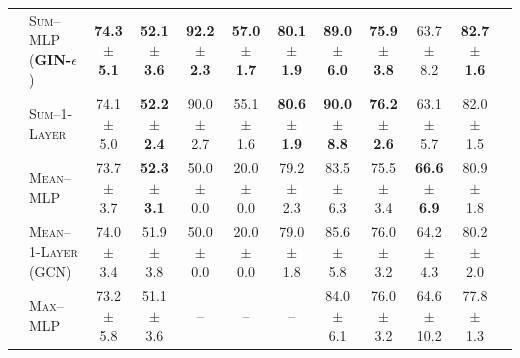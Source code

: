 \begin{table}[t]
{\begin{tabular}{@{}clcccccccccc@{}}
& \textsc{Sum--MLP ({\bf GIN-$\epsilon$}})   &  {\bf 74.3 $\pm$ 5.1}     & {\bf 52.1 $\pm$ 3.6}    &  {\bf 92.2 $\pm$ 2.3}             &  {\bf 57.0 $\pm$ 1.7}             & {\bf 80.1 $\pm$ 1.9}      &  {\bf 89.0 $\pm$ 6.0}     & {\bf 75.9 $\pm$ 3.8}    & 63.7 $\pm$ 8.2  & {\bf 82.7 $\pm$ 1.6}   \\
& \textsc{Sum--1-Layer}     &  74.1 $\pm$ 5.0    & {\bf 52.2 $\pm$ 2.4}    &  90.0 $\pm$ 2.7        &  55.1 $\pm$ 1.6            & {\bf 80.6 $\pm$ 1.9}      &  {\bf 90.0 $\pm$ 8.8}     & {\bf 76.2 $\pm$ 2.6}     & 63.1 $\pm$ 5.7 & 82.0 $\pm$ 1.5  \\
& \textsc{Mean--MLP}       &  73.7 $\pm$ 3.7  & {\bf 52.3 $\pm$ 3.1}     & 50.0 $\pm$ 0.0  &  20.0 $\pm$ 0.0 & 79.2 $\pm$ 2.3      &  83.5 $\pm$ 6.3        & 75.5 $\pm$ 3.4     & {\bf 66.6 $\pm$ 6.9}  & 80.9 $\pm$ 1.8  \\ 
& \textsc{Mean--1-Layer} (GCN)  &  74.0 $\pm$ 3.4    & 51.9 $\pm$ 3.8  & 50.0 $\pm$ 0.0  &  20.0 $\pm$ 0.0 & 79.0 $\pm$ 1.8               & 85.6 $\pm$ 5.8     & 76.0 $\pm$ 3.2     & 64.2 $\pm$ 4.3  & 80.2 $\pm$ 2.0   & \\   
& \textsc{Max--MLP}  &  73.2 $\pm$ 5.8    & 51.1 $\pm$ 3.6    &  --                       &  --                      &      --              & 84.0 $\pm$ 6.1          & 76.0 $\pm$ 3.2   & 64.6 $\pm$ 10.2 & 77.8 $\pm$ 1.3  & \\ 

\end{tabular}}
\end{table}
